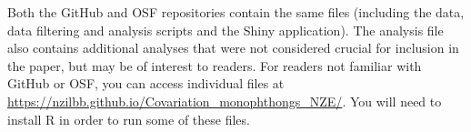 \documentclass[review]{elsarticle} %
\begin{document}
\noindent Both the GitHub and OSF repositories contain the same files (including the data, data filtering and analysis scripts and the Shiny application). The analysis file also contains additional analyses that were not considered crucial for inclusion in the paper, but may be of interest to readers. For readers not familiar with GitHub or OSF, you can access individual files at \url{https://nzilbb.github.io/Covariation_monophthongs_NZE/}. You will need to install R in order to run some of these files.

\vfill


\end{document}
